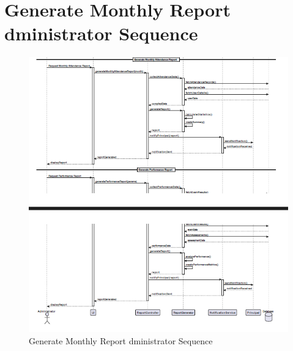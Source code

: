\documentclass[12pt,a4paper]{report}
\begin{document}
\section{Generate Monthly Report dministrator Sequence}
\begin{figure}[htbp]
    \centering
    \includegraphics[width=1\textwidth]{generate-monthly-report-dministrator-sequence.png}
    \caption{Generate Monthly Report dministrator Sequence}
    \label{fig:generate-monthly-report-dministrator-sequence}
\end{figure}
\end{document}
